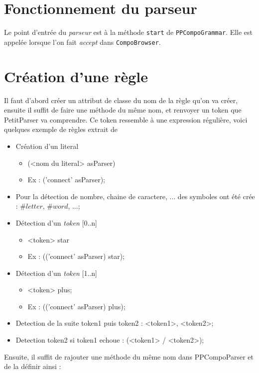 \documentclass[11pt,a4paper,openany,oneside]{book}
\begin{document}
\begin{appendices}
\section*{Fonctionnement du parseur}
Le point d'entrée du \textit{parseur} est à la méthode \texttt{start} de \texttt{PPCompoGrammar}. Elle est appelée lorsque l'on fait \textit{accept} dans \texttt{CompoBrowser}.

\section*{Création d'une règle}
Il faut d'abord créer un attribut de classe du nom de la règle qu'on va créer, ensuite il suffit de faire une méthode du même nom, 
et renvoyer un token que PetitParser va comprendre. Ce token ressemble à une expression régulière, voici quelques exemple de règles extrait de \citep{rulesParseur}
\begin{itemize}
\item  Création d'un literal
    \begin{itemize}
    \item (<nom du literal> asParser) 
    \item Ex :  ('connect' asParser);
    \end{itemize}
\item  Pour la détection de nombre, chaine de caractere, ... des symboles ont été crée : $\#letter$, $\#word$, ...;

\item Détection d'un \textit{token} [0..n]
    \begin{itemize}
    \item <token> star
    \item Ex : (('connect' asParser) star); 
    \end{itemize}

\item Détection d'un \textit{token} [1..n]
    \begin{itemize}
    \item <token> plus;
    \item  Ex : (('connect' asParser) plus); 
    \end{itemize}

\item Detection de la suite token1 puis token2 : <token1>, <token2>;
\item  Detection token2 si token1 echoue : (<token1> / <token2>);
\end{itemize}

Ensuite, il suffit de rajouter une méthode du même nom dans PPCompoParser et de la définir ainsi :



\end{appendices}
\end{document}
